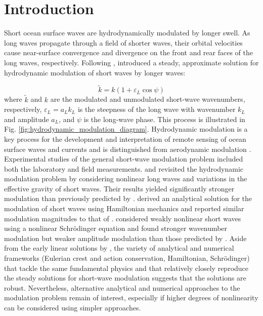 \documentclass[lineno]{jfm}
\begin{document}

\section{Introduction}

Short ocean surface waves are hydrodynamically modulated by longer swell.
As long waves propagate through a field of shorter waves, their orbital
velocities cause near-surface convergence and divergence on the front and rear
faces of the long waves, respectively.
Following \citet{unna1941white,unna1942waves,unna1947sea},
\citet{longuet1960changes} introduced a steady, approximate solution for
hydrodynamic modulation of short waves by longer waves:

\begin{equation}
\label{eq:lhs1960wavenumber}
\widetilde{k} = k (1 + \varepsilon_L \cos{\psi})
\end{equation}
where $\widetilde{k}$ and $k$ are the modulated and unmodulated short-wave wavenumbers,
respectively, $\varepsilon_L = a_L k_L$ is the steepness of the long wave with
wavenumber $k_L$ and amplitude $a_L$, and $\psi$ is the long-wave phase.
This process is illustrated in Fig. \ref{fig:hydrodynamic_modulation_diagram}.
Hydrodynamic modulation is a key process for the development and
interpretation of remote sensing of ocean surface waves and currents
\citep{keller1975microwave,alpers1978two,hara1994hydrodynamic} and is distinguished
from aerodynamic modulation \citep{donelan1987effect,belcher1999wave,chen2000effects}.
Experimental studies of the general short-wave modulation problem included both
the laboratory \citep[e.g.,][]{keller1975microwave,donelan2010modulation} and field
\citep[e.g.,][]{hara2003observation,plant1977studies} measurements.
\citet{phillips1981dispersion} and \citet{longuet1987propagation} revisited the
hydrodynamic modulation problem by considering nonlinear long waves and
variations in the effective gravity of short waves.
Their results yielded significantly stronger modulation than previously predicted
by \citet{longuet1960changes}.
\citet{henyey1988energy} derived an analytical solution for the modulation of
short waves using Hamiltonian mechanics and reported similar modulation magnitudes
to that of \citet{longuet1987propagation}.
\citet{zhang1990evolution} considered weakly nonlinear short waves
using a nonlinear Schr\" odinger equation and found stronger wavenumber
modulation but weaker amplitude modulation than those predicted by
\citet{longuet1987propagation}.
Aside from the early linear solutions by \citet{longuet1960changes}, the variety
of analytical and numerical frameworks (Eulerian crest and action conservation,
Hamiltonian, Schr\" odinger) that tackle the same fundamental
physics and that relatively closely reproduce the steady solutions for short-wave
modulation suggests that the solutions are robust.
Nevertheless, alternative analytical and numerical approaches to the modulation
problem remain of interest, especially if higher degrees of nonlinearity can be
considered using simpler approaches.
\end{document}
